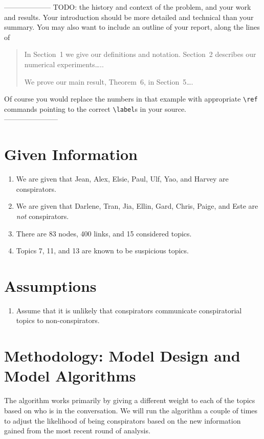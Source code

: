 \documentclass{icmmcm}
\begin{document}
\noindent -------------------- TODO:
the history and context of the problem,
and your work and results.  Your introduction should be more detailed
and technical than your summary.  You may also want to include an
outline of your report, along the lines of
\begin{quotation}
  In Section~1 we give our definitions and notation. Section~2
  describes our numerical experiments\ldots{}..
  
  We prove our main result, Theorem~6, in Section~5\ldots{}.
\end{quotation}
Of course you would replace the numbers in that example with
appropriate \verb|\ref| commands pointing to the correct
\verb|\label|s in your source.\\
-----------------------

\section{Given Information}
\begin{enumerate}
\item We are given that Jean, Alex, Elsie, Paul, Ulf, Yao,
and Harvey are conspirators.
\item We are given that Darlene, Tran, Jia, Ellin, Gard, Chris,
Paige, and Este are \textit{not} conspirators.
\item There are 83 nodes, 400 links, and 15 considered topics.
\item Topics 7, 11, and 13 are known to be suspicious topics.
\end{enumerate}

\section{Assumptions}

\begin{enumerate}
\item Assume that it is unlikely that conspirators communicate
conspiratorial topics to non-conspirators.
\end{enumerate}
\section{Methodology: Model Design and Model Algorithms}

The algorithm works primarily by giving a different weight to each of the 
topics based on who is in the conversation. We will run the algorithm
a couple of times to adjust the likelihood of being conspirators
based on the new information gained from the most 
recent round of analysis.
\end{document}
